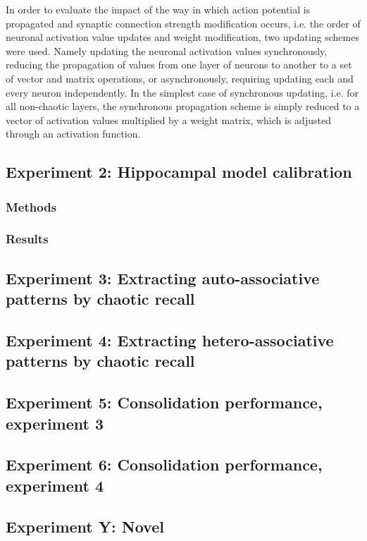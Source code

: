 In order to evaluate the impact of the way in which action potential is propagated and synaptic connection strength modification occurs, i.e. the order of neuronal activation value updates and weight modification, two updating schemes were used. Namely updating the neuronal activation values synchronously, reducing the propagation of values from one layer of neurons to another to a set of vector and matrix operations, or asynchronously, requiring updating each and every neuron independently. In the simplest case of synchronous updating, i.e. for all non-chaotic layers, the synchronous propagation scheme is simply reduced to a vector of activation values multiplied by a weight matrix, which is adjusted through an activation function.

\subsection{Experiment 2: Hippocampal model calibration}
\subsubsection{Methods}
\subsubsection{Results}

\subsection{Experiment 3: Extracting auto-associative patterns by chaotic recall}
\subsection{Experiment 4: Extracting hetero-associative patterns by chaotic recall}

\subsection{Experiment 5: Consolidation performance, experiment 3}
\subsection{Experiment 6: Consolidation performance, experiment 4}

\subsection{Experiment Y: Novel}


